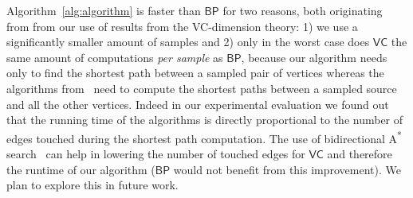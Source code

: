 Algorithm~\ref{alg:algorithm} is faster than $\mathsf{BP}$ for two reasons, both
originating from from our use of results from the VC-dimension theory: 1) we use
a significantly smaller amount of samples and 2) only in the worst case does
$\mathsf{VC}$ the same amount of computations \emph{per sample} as
$\mathsf{BP}$, because our algorithm needs only to find the shortest path
between a sampled pair of vertices whereas the algorithms
from~\citep{GeisbergerSS08,BrandesP07} need to compute the shortest paths
between a sampled source and all the other vertices. Indeed in our experimental
evaluation we found out that the running time of the algorithms is directly
proportional to the number of edges touched during the shortest path
computation. The use of bidirectional A\textsuperscript{*}
search~\citep{Pohl69,KaindlK97} can help in lowering the number of touched edges
for $\mathsf{VC}$ and therefore the runtime of our algorithm ($\mathsf{BP}$
would not benefit from this improvement). We plan to explore this in future
work.




